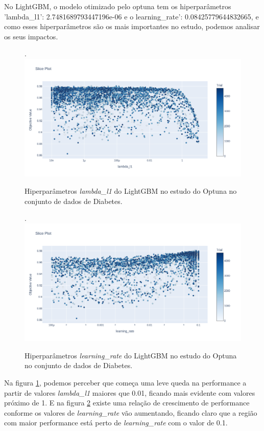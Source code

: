 No LightGBM, o modelo otimizado pelo optuna tem os hiperparâmetros 'lambda\_l1': 2.7481689793447196e-06 e o learning\_rate': 0.08425779644832665, e como esses hiperparâmetros são os mais importantes no estudo, podemos analisar os seus impactos.

\begin{figure}[H]
 \caption{Hiperparâmetros \textit{lambda\_l1} do LightGBM no estudo do Optuna no conjunto de dados de Diabetes.}.
 \label{fig:op:dia:lamb:lgbm}
 \centering
 \includegraphics[scale=0.3]{images/optuna_lgbm_lambda_dia.png}
\end{figure}
\begin{figure}[H]
 \caption{Hiperparâmetros \textit{learning\_rate} do LightGBM no estudo do Optuna no conjunto de dados de Diabetes.}.
 \label{fig:op:dia:learn:lgbm}
 \centering
 \includegraphics[scale=0.3]{images/optuna_lgbm_learn_dia.png}
\end{figure}
Na figura \ref{fig:op:dia:lamb:lgbm}, podemos perceber que começa uma leve queda na performance a partir de valores \textit{lambda\_l1} maiores que 0.01, ficando mais evidente com valores próximo de 1. E na figura \ref{fig:op:dia:learn:lgbm} existe uma relação de crescimento de performance conforme os valores de \textit{learning\_rate} vão aumentando, ficando claro que a região com maior performance está perto de  \textit{learning\_rate} com o valor de 0.1.


